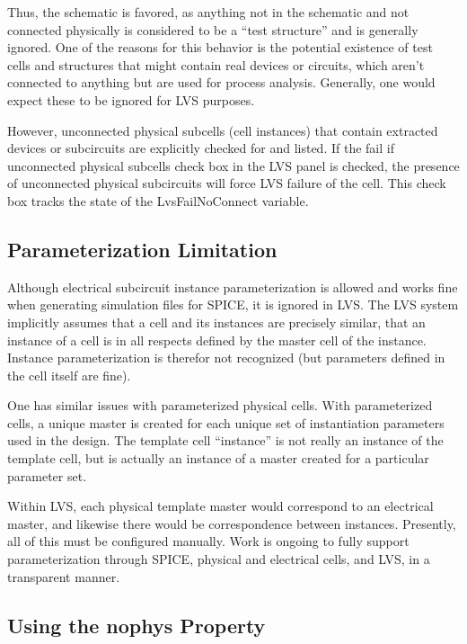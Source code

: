 Thus, the schematic is favored, as anything not in the schematic and
not connected physically is considered to be a ``test structure'' and
is generally ignored.  One of the reasons for this behavior is the
potential existence of test cells and structures that might contain
real devices or circuits, which aren't connected to anything but are
used for process analysis.  Generally, one would expect these to be
ignored for LVS purposes.

However, unconnected physical subcells (cell instances) that contain
extracted devices or subcircuits are explicitly checked for and
listed.  If the {\cb fail if unconnected physical subcells} check box
in the {\cb LVS} panel is checked, the presence of unconnected
physical subcircuits will force LVS failure of the cell.  This check
box tracks the state of the {\et LvsFailNoConnect} variable.

\subsection{Parameterization Limitation}

Although electrical subcircuit instance parameterization is allowed
and works fine when generating simulation files for SPICE, it is
ignored in LVS.  The LVS system implicitly assumes that a cell and
its instances are precisely similar, that an instance of a cell is in
all respects defined by the master cell of the instance.  Instance
parameterization is therefor not recognized (but parameters defined
in the cell itself are fine).

One has similar issues with parameterized physical cells.  With
parameterized cells, a unique master is created for each unique set
of instantiation parameters used in the design.  The template cell
``instance'' is not really an instance of the template cell, but is
actually an instance of a master created for a particular parameter
set.

Within LVS, each physical template master would correspond to an
electrical master, and likewise there would be correspondence between
instances.  Presently, all of this must be configured manually.  Work
is ongoing to fully support parameterization through SPICE, physical
and electrical cells, and LVS, in a transparent manner.

\subsection{Using the nophys Property}

